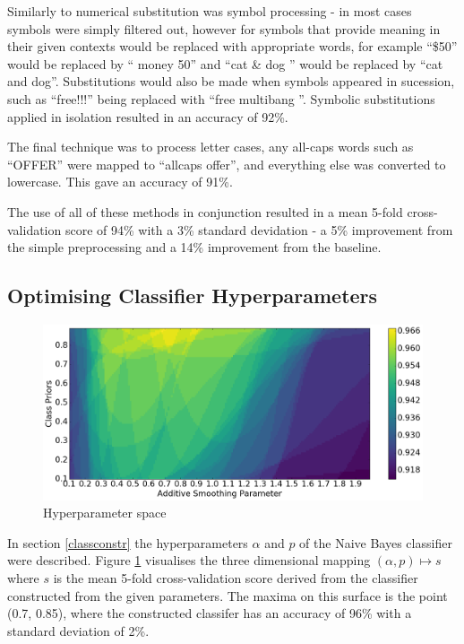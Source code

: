 \documentclass[12pt, a4paper]{article}
\begin{document}
  Similarly to numerical substitution was symbol processing - in most cases symbols were simply filtered out, however for symbols that provide meaning in their given contexts would be replaced with appropriate words, for example ``\$50'' would be replaced by `` money 50'' and ``cat \& dog '' would be replaced by ``cat and dog''. Substitutions would also be made when symbols appeared in sucession, such as ``free!!!'' being replaced with ``free multibang ''. Symbolic substitutions applied in isolation resulted in an accuracy of 92\%.


  The final technique was to process letter cases, any all-caps words such as ``OFFER'' were mapped to ``allcaps offer'', and everything else was converted to lowercase. This gave an accuracy of 91\%.

  The use of all of these methods in conjunction resulted in a mean 5-fold cross-validation score of 94\% with a 3\% standard devidation - a 5\% improvement from the simple preprocessing and a 14\% improvement from the baseline.

	\begin{minipage}{\linewidth}
  \subsection{Optimising Classifier Hyperparameters} \label{hyperopt}

  \begin{figure}
    \vspace{-0.6cm}
    \caption{Hyperparameter space}
    \vspace{-0.1cm}
    \label{hyperspace}
    \centering
    \includegraphics[width=1\linewidth]{report_images/MultinomialNB_param_space}
    \vspace{-1cm}
  \end{figure}

  In section \ref{classconstr} the hyperparameters $\alpha$ and $p$ of the Naive Bayes classifier were described. Figure \ref{hyperspace} visualises the three dimensional mapping $(\alpha, p) \mapsto s$ where $s$ is the mean 5-fold cross-validation score derived from the classifier constructed from the given parameters. The maxima on this surface is the point (0.7, 0.85), where the constructed classifer has an accuracy of 96\% with a standard deviation of 2\%.
	\end{minipage}
\end{document}
